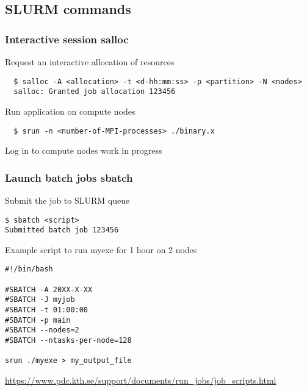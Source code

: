 \subsection*{SLURM commands}

\begin{frame}[fragile]
\frametitle{Interactive session \hfill \alert{\textbf{salloc}}}

\begin{exampleblock}{Request an interactive allocation of resources}
  \footnotesize
  \begin{verbatim}
  $ salloc -A <allocation> -t <d-hh:mm:ss> -p <partition> -N <nodes>
  salloc: Granted job allocation 123456
  \end{verbatim}
\end{exampleblock}

\begin{exampleblock}{Run application on compute nodes}
  \footnotesize
  \begin{verbatim}
  $ srun -n <number-of-MPI-processes> ./binary.x
  \end{verbatim}
\end{exampleblock}

\begin{exampleblock}{Log in to compute nodes}
  \footnotesize
  work in progress
\end{exampleblock}
  
\end{frame}

\begin{frame}[fragile]
\frametitle{Launch batch jobs \hfill  \alert{\textbf{sbatch}}}
\begin{exampleblock}{Submit the job to SLURM queue}
\footnotesize
\begin{verbatim}
$ sbatch <script>
Submitted batch job 123456
\end{verbatim}
\end{exampleblock}

\begin{exampleblock}{Example script to run myexe for 1 hour on 2 nodes}
\footnotesize
\begin{verbatim}
#!/bin/bash

#SBATCH -A 20XX-X-XX
#SBATCH -J myjob
#SBATCH -t 01:00:00
#SBATCH -p main
#SBATCH --nodes=2
#SBATCH --ntasks-per-node=128

srun ./myexe > my_output_file
\end{verbatim}
\end{exampleblock}

\scriptsize
\href{https://www.pdc.kth.se/support/documents/run\_jobs/job\_scripts.html}{https://www.pdc.kth.se/support/documents/run\_jobs/job\_scripts.html}
\end{frame}


